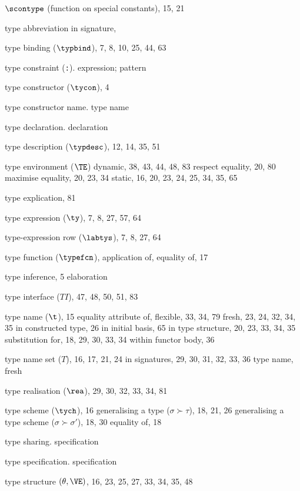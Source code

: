 \begin{theindex}
\item $\scontype$ (function on special constants), 15, 21
\item type abbreviation in signature, \typabbrinsigsrefs
\item type binding ($\typbind$),  7, 8, 10, 25, 44, 63
\item type constraint (\verb+:+). \see expression; pattern 
\item type constructor ($\tycon$), 4
\item type constructor name. \see type name 
\item type declaration. \see declaration
\item type description ($\typdesc$), 12, 14, 35, 51
\item type environment ($\TE$)
\subitem dynamic, 38,  43, 44, 48, 83
\subitem respect equality, 20, 80
\subitem maximise equality, 20, 23, 34
\subitem static, 16, 20, 23, 24, 25, 34, 35, 65
\item type explication, 81
\item type expression ($\ty$), 7, 8, 27, 57, 64
\item type-expression row ($\labtys$), 7, 8, 27, 64
\item type function ($\typefcn$), \Lambdarefs
\subitem application of, \typefunctionrefs
\subitem equality of, 17
\item type inference, 5
\subitem \seealso elaboration
\item type interface ($T\!I$), 47, 48, 50, 51, 83
\item type name ($\t$), 15
\subitem equality attribute of, \eqtynamerefs
\subitem flexible, 33, 34, 79
\subitem fresh, 23, 24, 32, 34, 35
\subitem in constructed type, 26
\subitem in initial basis, 65
\subitem in type structure, 20, 23, 33, 34, 35
\subitem substitution for, 18, 29, 30, 33, 34
\subitem within functor body, 36
\item type name set ($T$), 16, 17, 21, 24
\subitem in signatures,  29, 30, 31, 32, 33, 36
\subitem \seealso type name, fresh
\item type realisation ($\rea$), 29, 30, 32, 33, 34, 81
\item type scheme ($\tych$), 16
\subitem generalising a type ($\sigma\succ\tau$), 18, 21, 26
\subitem generalising a type scheme ($\sigma\succ\sigma'$), 18, 30
\subitem equality of, 18
\item type sharing. \see specification
\item type specification. \see specification
\item type structure $(\theta,\VE)$, 16, 23, 25, 27, 33, 34, 35, 48

\end{theindex}
